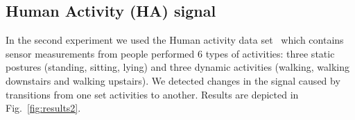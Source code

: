 \subsection{Human Activity (HA) signal}
In the second experiment we used the Human activity data set~\cite{reyes2016transition} which contains sensor measurements from people performed 6 types of activities: three static postures (standing, sitting, lying) and three dynamic activities (walking, walking downstairs and walking
upstairs).
We detected changes in the signal caused by transitions from one set activities to another.
Results are depicted in Fig.~\ref{fig:results2}.
\begin{figure}[!htb]
    \begin{minipage}{0.5\textwidth}
        \centering
        \\
        \fbox{
            \includegraphics[
}
\end{minipage}
\end{figure}
